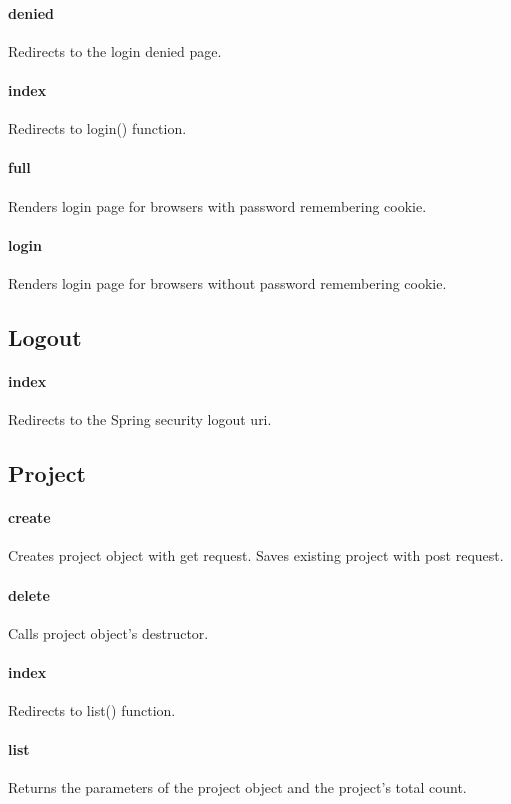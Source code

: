 \documentclass[12pt]{article}
\begin{document}
\paragraph{denied} Redirects to the login denied page.
\paragraph{index} Redirects to login() function.
\paragraph{full} Renders login page for browsers with password remembering cookie.
\paragraph{login} Renders login page for browsers without password remembering cookie.

\subsection{Logout}\label{sec:CLogout}
\paragraph{index} Redirects to the Spring security logout uri.

\subsection{Project}\label{sec:CProject}
\paragraph{create} Creates project object with get request. Saves existing project with post request.
\paragraph{delete} Calls project object's destructor.
\paragraph{index} Redirects to list() function.
\paragraph{list} Returns the parameters of the project object and the project's total count.
\end{document}
